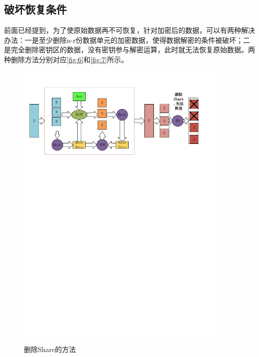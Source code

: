\subsection{破坏恢复条件}
前面已经提到，为了使原始数据再不可恢复，针对加密后的数据，可以有两种解决办法：一是至少删除n-r份数据单元的加密数据，使得数据解密的条件被破坏；二是完全删除密钥区的数据，没有密钥参与解密运算，此时就无法恢复原始数据。两种删除方法分别对应\autoref{fig:6}和\autoref{fig:7}所示。
\begin{figure}[H]
	\centering
	\includegraphics[width=4in]{Pics/del-share.pdf}
	\caption{删除Share的方法}\label{fig:6}
\end{figure}
